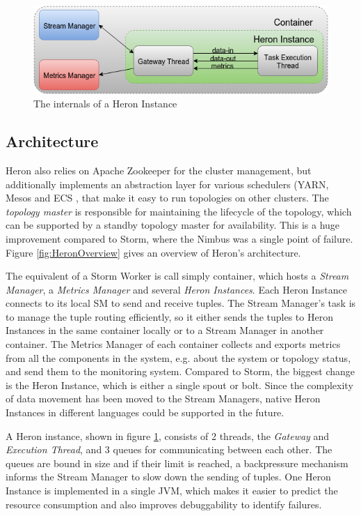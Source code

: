 \documentclass[conference]{IEEEtran}
\begin{document}
\begin{figure}
    \centering
    \includegraphics[scale=0.35]{figures/HeronInstance}
    \caption{The internals of a Heron Instance}
    \label{fig:HeronInstance}
\end{figure}

\subsection{Architecture}
\label{sec:TwitterHeronArchitecture}

Heron also relies on Apache Zookeeper for the cluster management, but additionally implements an abstraction layer for various schedulers (YARN, Mesos and ECS \cite{Aurora, YARM}, that make it easy to run topologies on other clusters.
The \emph{topology master} is responsible for maintaining the lifecycle of the topology, which can be supported by a standby topology master for availability.
This is a huge improvement compared to Storm, where the Nimbus was a single point of failure.
Figure \ref{fig:HeronOverview} gives an overview of Heron's architecture.

The equivalent of a Storm Worker is call simply container, which hosts a \emph{Stream Manager}, a \emph{Metrics Manager} and several \emph{Heron Instances}.
Each Heron Instance connects to its local SM to send and receive tuples.
The Stream Manager's task is to manage the tuple routing efficiently, so it either sends the tuples to Heron Instances in the same container locally or to a Stream Manager in another container.
The Metrics Manager of each container collects and exports metrics from all the components in the system, e.g. about the system or topology status, and send them to the monitoring system.
Compared to Storm, the biggest change is the Heron Instance, which is either a single spout or bolt.
Since the complexity of data movement has been moved to the Stream Managers, native Heron Instances in different languages could be supported in the future.

A Heron instance, shown in figure \ref{fig:HeronInstance}, consists of 2 threads, the \emph{Gateway} and \emph{Execution Thread}, and 3 queues for communicating between each other.
The queues are bound in size and if their limit is reached, a backpressure mechanism informs the Stream Manager to slow down the sending of tuples.
One Heron Instance is implemented in a single JVM, which makes it easier to predict the resource consumption and also improves debuggability to identify failures.
\end{document}
